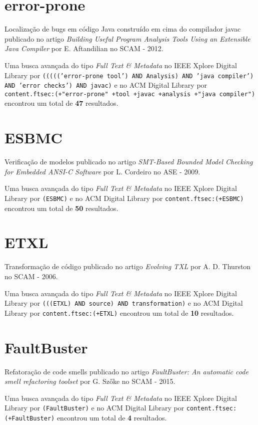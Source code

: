 \section{error-prone}

Localização de bugs em código Java construído em cima do compilador javac
publicado no artigo
{\it Building Useful Program Analysis Tools Using an Extensible Java Compiler}
por
E. Aftandilian
no
SCAM
-
2012.


Uma busca avançada do tipo {\it Full Text \& Metadata} no IEEE Xplore Digital Library por
\texttt{((((('error-prone tool') AND Analysis) AND 'java compiler') AND 'error checks') AND javac)}
e no ACM Digital Library por
\texttt{content.ftsec:(+"error-prone" +tool +javac +analysis +"java compiler")}
encontrou um total de
{\bf 47}
resultados.

\section{ESBMC}

Verificação de modelos
publicado no artigo
{\it SMT-Based Bounded Model Checking for Embedded ANSI-C Software}
por
L. Cordeiro
no
ASE
-
2009.


Uma busca avançada do tipo {\it Full Text \& Metadata} no IEEE Xplore Digital Library por
\texttt{(ESBMC)}
e no ACM Digital Library por
\texttt{content.ftsec:(+ESBMC)}
encontrou um total de
{\bf 50}
resultados.

\section{ETXL}

Transformação de código
publicado no artigo
{\it Evolving TXL}
por
A. D. Thurston
no
SCAM
-
2006.


Uma busca avançada do tipo {\it Full Text \& Metadata} no IEEE Xplore Digital Library por
\texttt{(((ETXL) AND source) AND transformation)}
e no ACM Digital Library por
\texttt{content.ftsec:(+ETXL)}
encontrou um total de
{\bf 10}
resultados.

\section{FaultBuster}

Refatoração de code smells
publicado no artigo
{\it FaultBuster: An automatic code smell refactoring toolset}
por
G. Szőke
no
SCAM
-
2015.


Uma busca avançada do tipo {\it Full Text \& Metadata} no IEEE Xplore Digital Library por
\texttt{(FaultBuster)}
e no ACM Digital Library por
\texttt{content.ftsec:(+FaultBuster)}
encontrou um total de
{\bf 4}
resultados.

